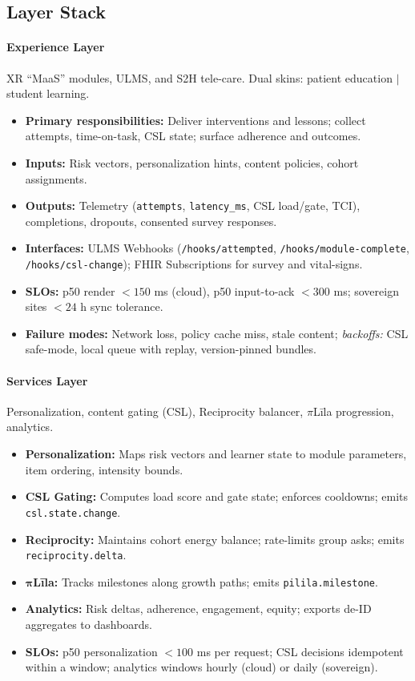 \documentclass[11pt]{article}
\theoremstyle{plain}
\begin{document}
\subsection{Layer Stack}
\paragraph{Experience Layer}
XR ``MaaS'' modules, ULMS, and S2H tele-care. Dual skins: patient education \(|\) student learning.
\begin{itemize}
  \item \textbf{Primary responsibilities:} Deliver interventions and lessons; collect attempts, time-on-task, CSL state; surface adherence and outcomes.
  \item \textbf{Inputs:} Risk vectors, personalization hints, content policies, cohort assignments.
  \item \textbf{Outputs:} Telemetry (\texttt{attempts}, \texttt{latency\_ms}, CSL load/gate, TCI), completions, dropouts, consented survey responses.
  \item \textbf{Interfaces:} ULMS Webhooks (\texttt{/hooks/attempted}, \texttt{/hooks/module-complete}, \texttt{/hooks/csl-change}); FHIR Subscriptions for survey and vital-signs.
  \item \textbf{SLOs:} p50 render \(<150\) ms (cloud), p50 input-to-ack \(<300\) ms; sovereign sites \(<24\) h sync tolerance.
  \item \textbf{Failure modes:} Network loss, policy cache miss, stale content; \emph{backoffs:} CSL safe-mode, local queue with replay, version-pinned bundles.
\end{itemize}

\paragraph{Services Layer}
Personalization, content gating (CSL), Reciprocity balancer, \(\pi\)Līla progression, analytics.
\begin{itemize}
  \item \textbf{Personalization:} Maps risk vectors and learner state to module parameters, item ordering, intensity bounds.
  \item \textbf{CSL Gating:} Computes load score and gate state; enforces cooldowns; emits \texttt{csl.state.change}.
  \item \textbf{Reciprocity:} Maintains cohort energy balance; rate-limits group asks; emits \texttt{reciprocity.delta}.
  \item \(\boldsymbol{\pi}\)\textbf{Līla:} Tracks milestones along growth paths; emits \texttt{pilila.milestone}.
  \item \textbf{Analytics:} Risk deltas, adherence, engagement, equity; exports de-ID aggregates to dashboards.
  \item \textbf{SLOs:} p50 personalization \(<100\) ms per request; CSL decisions idempotent within a window; analytics windows hourly (cloud) or daily (sovereign).
\end{itemize}
\end{document}
